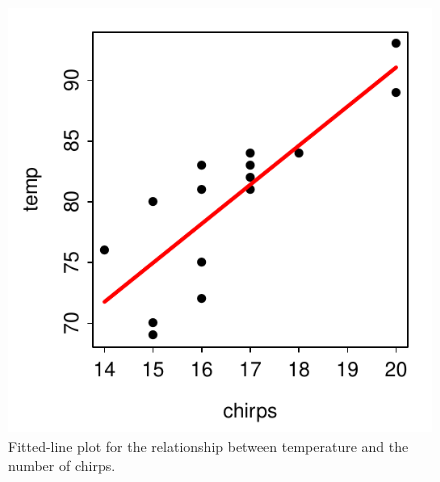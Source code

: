\documentclass[10pt,openany]{book}\usepackage[]{graphicx}\usepackage[]{color}
\newenvironment{knitrout}{}{} %
\begin{document}
\begin{itemize}
\begin{enumerate}
\begin{knitrout}
\begin{figure}[hbtp]
{\centering \includegraphics[width=.4\linewidth]{Figs/ChirpsFitPlot-1} 

}

\caption[Fitted-line plot for the relationship between temperature and the number of chirps]{Fitted-line plot for the relationship between temperature and the number of chirps.}\label{fig:ChirpsFitPlot}
\end{figure}


\end{knitrout}
    \end{enumerate}

\end{itemize}




\end{document}
